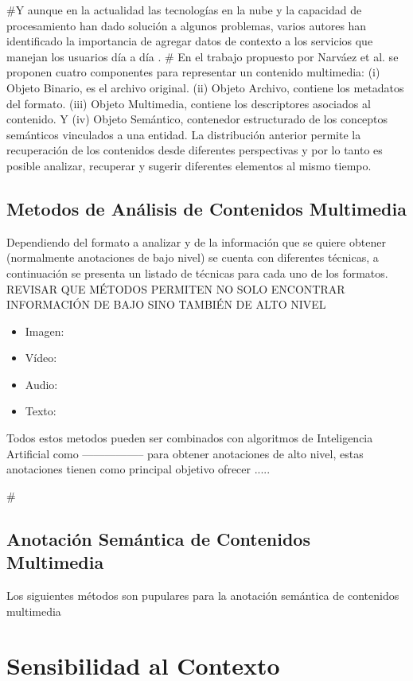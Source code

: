 #Y aunque en la actualidad las tecnologías en la nube y la capacidad de procesamiento han dado solución a algunos problemas, varios autores han identificado la importancia de agregar datos de contexto a los servicios que manejan los usuarios día a día \cite{dey2001understanding, alegre2016engineering}.
# En el trabajo propuesto por Narváez et al. \cite{narvaez2016modelo} se proponen cuatro componentes para representar un contenido  multimedia: (i) Objeto Binario, es el archivo original. (ii) Objeto Archivo, contiene los metadatos del formato. (iii) Objeto Multimedia, contiene los descriptores asociados al contenido. Y (iv) Objeto Semántico, contenedor estructurado de los conceptos semánticos vinculados a una entidad. La distribución anterior permite la recuperación de los contenidos desde diferentes perspectivas y por lo tanto es posible analizar, recuperar y sugerir diferentes elementos al mismo tiempo.

\subsection{Metodos de Análisis de Contenidos Multimedia}

Dependiendo del formato a analizar y de la información que se quiere obtener (normalmente anotaciones de bajo nivel) se cuenta con diferentes técnicas, a continuación se presenta un listado de técnicas para cada uno de los formatos.
REVISAR QUE MÉTODOS PERMITEN NO SOLO ENCONTRAR INFORMACIÓN DE BAJO SINO TAMBIÉN DE ALTO NIVEL
\begin{itemize}
    \item Imagen:
    \item Vídeo:
    \item Audio:
    \item Texto:
\end{itemize}

Todos estos metodos pueden ser combinados con algoritmos de Inteligencia Artificial como ----------------- para obtener anotaciones de alto nivel, estas anotaciones tienen como principal objetivo ofrecer .....

#\subsection{Anotación Semántica de Contenidos Multimedia}

Los siguientes métodos son pupulares para la anotación semántica de contenidos multimedia


\section{Sensibilidad al Contexto}
\label{sec:MT_SensibilidadContexto}


